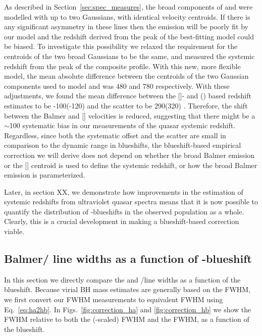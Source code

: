 As described in Section~\ref{sec:spec_measures}, the broad components of \ha and \hb were modelled with up to two Gaussians, with identical velocity centroids. 
If there is any significant asymmetry in these lines then the emission will be poorly fit by our model and the 
redshift derived from the peak of the best-fitting model could be biased. 
To investigate this possibility we relaxed the requirement for the centroids of the two broad Gaussians to be the same, and measured the systemic redshift from the peak of the composite profile. 
With this new, more flexible model, the mean absolute difference between the centroids of the two Gaussian components used to model \ha and \hb was 480 and 780 \kms respectively. 
With these adjustments, we found the mean difference between the []- and \hans(\hbns) based redshift estimates to be -100(-120) \kms and the scatter to be 290(320) \kms. 
Therefore, the shift between the Balmer and [] velocities is reduced, suggesting that there might be a $\sim$100 \kms systematic bias in our measurements of the quasar systemic redshift.  
Regardless, since both the systematic offset and the scatter are small in comparison to the dynamic range in  blueshifts, the blueshift-based empirical correction we will derive does not depend on whether the broad Balmer emission or the [] centroid is used to define the systemic redshift, or how the broad Balmer emission is parameterized. 

Later, in section XX, we demonstrate how improvements in the estimation of systemic redshifts from ultraviolet quasar spectra means that it is now possible to quantify the distribution of -blueshifts in the observed population as a whole. 
Clearly, this is a crucial development in making a blueshift-based correction viable.

\subsection{Balmer/ line widths as a function of -blueshift}
\label{sec:correction}

In this section we directly compare the  and \hans/\hb line widths as a function of the  blueshift. 
Because virial BH mass estimates are generally based on the \hb FWHM, we first convert our \ha FWHM measurements to equivalent \hb FWHM using Eq.~\ref{eq:ha2hb}.  
In Figs.~\ref{fig:correction_ha} and \ref{fig:correction_hb} we show the  FWHM relative to both the (\hbns-scaled) \ha FWHM and the \hb FWHM, as a function of the  blueshift. 

